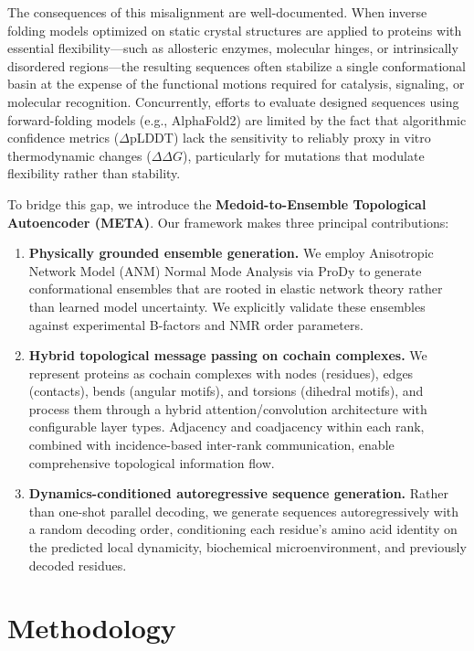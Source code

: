 \documentclass{article}
\begin{document}
The consequences of this misalignment are well-documented. When inverse folding models optimized on static crystal structures are applied to proteins with essential flexibility---such as allosteric enzymes, molecular hinges, or intrinsically disordered regions---the resulting sequences often stabilize a single conformational basin at the expense of the functional motions required for catalysis, signaling, or molecular recognition. Concurrently, efforts to evaluate designed sequences using forward-folding models (e.g., AlphaFold2) are limited by the fact that algorithmic confidence metrics ($\Delta$pLDDT) lack the sensitivity to reliably proxy in vitro thermodynamic changes ($\Delta\Delta G$), particularly for mutations that modulate flexibility rather than stability.

To bridge this gap, we introduce the \textbf{Medoid-to-Ensemble Topological Autoencoder (META)}. Our framework makes three principal contributions:

\begin{enumerate}
    \item \textbf{Physically grounded ensemble generation.} We employ Anisotropic Network Model (ANM) Normal Mode Analysis via ProDy to generate conformational ensembles that are rooted in elastic network theory rather than learned model uncertainty. We explicitly validate these ensembles against experimental B-factors and NMR order parameters.
    \item \textbf{Hybrid topological message passing on cochain complexes.} We represent proteins as cochain complexes with nodes (residues), edges (contacts), bends (angular motifs), and torsions (dihedral motifs), and process them through a hybrid attention/convolution architecture with configurable layer types. Adjacency and coadjacency within each rank, combined with incidence-based inter-rank communication, enable comprehensive topological information flow.
    \item \textbf{Dynamics-conditioned autoregressive sequence generation.} Rather than one-shot parallel decoding, we generate sequences autoregressively with a random decoding order, conditioning each residue's amino acid identity on the predicted local dynamicity, biochemical microenvironment, and previously decoded residues.
\end{enumerate}

\section{Methodology}
\end{document}
